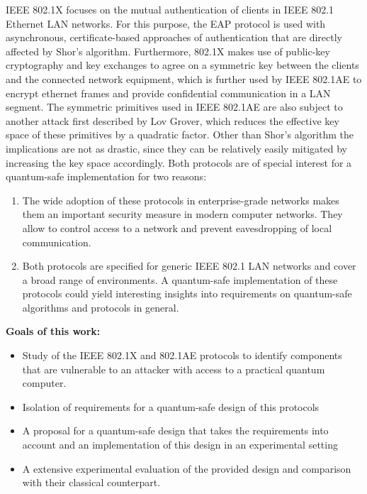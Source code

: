 \documentclass[BCOR=5mm,DIV=12]{scrbook}
\begin{document}
IEEE 802.1X focuses on the mutual authentication of clients in IEEE 802.1 Ethernet LAN networks. For this purpose, the EAP protocol is used with asynchronous, certificate-based approaches of authentication that are directly affected by Shor's algorithm. Furthermore, 802.1X makes use of public-key cryptography and key exchanges to agree on a symmetric key between the clients and the connected network equipment, which is further used by IEEE 802.1AE to encrypt ethernet frames and provide confidential communication in a LAN segment. The symmetric primitives used in IEEE 802.1AE are also subject to another attack first described by Lov Grover, which reduces the effective key space of these primitives by a quadratic factor. Other than Shor's algorithm the implications are not as drastic, since they can be relatively easily mitigated by increasing the key space accordingly. Both protocols are of special interest for a quantum-safe implementation for two reasons:

\begin{enumerate}
    \item The wide adoption of these protocols in enterprise-grade networks makes them an important security measure in modern computer networks. They allow to control access to a network and prevent eavesdropping of local communication.
    \item Both protocols are specified for generic IEEE 802.1 LAN networks and cover a broad range of environments. A quantum-safe implementation of these protocols could yield interesting insights into requirements on quantum-safe algorithms and protocols in general.
\end{enumerate}

\textbf{Goals of this work:}

\begin{itemize}
    \item Study of the IEEE 802.1X and 802.1AE protocols to identify components that are vulnerable to an attacker with access to a practical quantum computer.
    \item Isolation of requirements for a quantum-safe design of this protocols
    \item A proposal for a quantum-safe design that takes the requirements into account and an implementation of this design in an experimental setting
    \item A extensive experimental evaluation of the provided design and comparison with their classical counterpart. 
\end{itemize}
\end{document}
